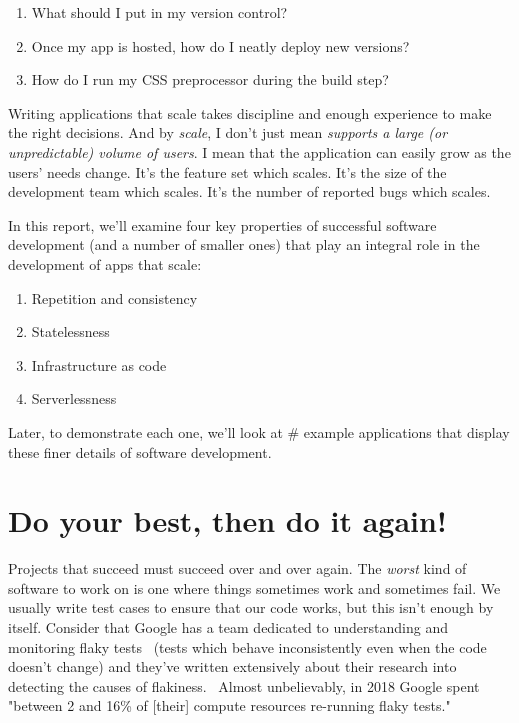 \documentclass{article}
\newcommand{\noterm}[1]{\textit{#1}}
\newcommand{\term}[1]{\noterm{#1}\index{#1}}
\begin{document}
\begin{enumerate}
  \item What should I put in my version control?
  \item Once my app is hosted, how do I neatly deploy new versions?
  \item How do I run my CSS preprocessor during the build step?
\end{enumerate}
Writing applications that scale takes discipline and enough experience to make the right decisions.
And by \term{scale}, I don't just mean \noterm{supports a large (or unpredictable) volume of users}.
I mean that the application can easily grow as the users' needs change.
It's the feature set which scales.
It's the size of the development team which scales.
It's the number of reported bugs which scales.

In this report, we'll examine four key properties of successful software development (and a number of smaller ones) that play an integral role in the development of apps that scale:

\begin{enumerate}
  \item Repetition and consistency
  \item Statelessness
  \item Infrastructure as code
  \item Serverlessness
\end{enumerate}
Later, to demonstrate each one, we'll look at \# example applications that display these finer details of software development.

\section{Do your best, then do it again!}

Projects that succeed must succeed over and over again.
The \textit{worst} kind of software to work on is one where things sometimes work and sometimes fail.
We usually write test cases to ensure that our code works, but this isn't enough by itself.
Consider that Google has a team dedicated to understanding and monitoring flaky tests~\cite{google-flaky-blog} (tests which behave inconsistently even when the code doesn't change) and they've written extensively about their research into detecting the causes of flakiness.~\cite{google-deflake}
Almost unbelievably, in 2018 Google spent "between 2 and 16\% of [their] compute resources re-running flaky tests."~\cite{google-testing}
\end{document}
